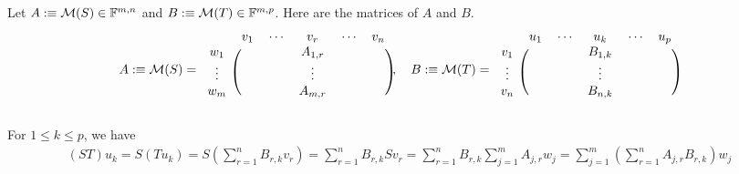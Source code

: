 Let $A :\equiv \mathcal{M}(S)\in \mathbb{F}^{m,n}$ and $B :\equiv \mathcal{M}(T)\in \mathbb{F}^{m,p}$. Here are the matrices of $A$ and $B$.
\begin{equation}
  A :\equiv \mathcal{M} (S) =
  \begin{blockarray}{cccccc}
    & v_1 & \cdots & v_r     & \cdots & v_n \\
    \begin{block}{c(ccccc)}
      w_1    &     &        & A_{1,r} &        &     \\
      \vdots &     &        & \vdots  &        &     \\
      w_m    &     &        & A_{m,r} &        &     \\
    \end{block}
  \end{blockarray},
  \quad
  B :\equiv \mathcal{M} (T) =
  \begin{blockarray}{cccccc}
    & u_1 & \cdots & u_k     & \cdots & u_p \\
    \begin{block}{c(ccccc)}
      v_1    &     &        & B_{1,k} &        &     \\
      \vdots &     &        & \vdots  &        &     \\
      v_n    &     &        & B_{n,k} &        &     \\
    \end{block}
  \end{blockarray}
\end{equation}

For $1 \leq k \leq p$, we have
\begin{equation}
  \begin{aligned}
    (ST) u_k
    = S (Tu_k)
    = S \left ( \sum_{r=1}^{n} B_{r,k} v_r \right )
    =  \sum_{r=1}^{n} B_{r,k} S v_r
    =  \sum_{r=1}^{n} B_{r,k} \sum_{j=1}^{m} A_{j,r}  w_j
    =  \sum_{j=1}^{m} \left( \sum_{r=1}^{n} A_{j,r}  B_{r,k} \right) w_j
  \end{aligned}
\end{equation}

